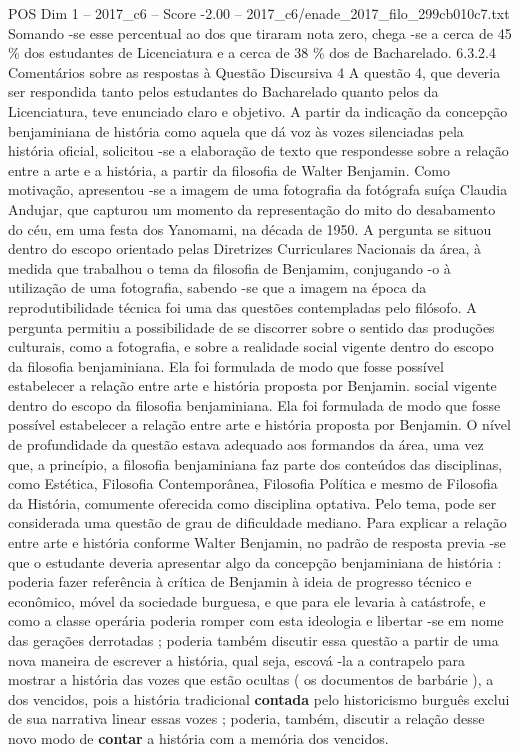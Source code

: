 \begin{textsample}{POS Dim 1 – 2017\_c6 – Score -2.00 – 2017\_c6/enade\_2017\_filo\_299cb010c7.txt}
Somando -se esse percentual ao dos que tiraram nota zero, chega -se a cerca de 45 \% dos estudantes de Licenciatura e a cerca de 38 \% dos de Bacharelado. 6.3.2.4 Comentários sobre as respostas à Questão Discursiva 4 A questão 4, que deveria ser respondida tanto pelos estudantes do Bacharelado quanto pelos da Licenciatura, teve enunciado claro e objetivo.
A partir da indicação da concepção benjaminiana de história como aquela que dá voz às vozes silenciadas pela história oficial, solicitou -se a elaboração de texto que respondesse sobre a relação entre a arte e a história, a partir da filosofia de Walter Benjamin.
Como motivação, apresentou -se a imagem de uma fotografia da fotógrafa suíça Claudia Andujar, que capturou um momento da representação do mito do desabamento do céu, em uma festa dos Yanomami, na década de 1950.
A pergunta se situou dentro do escopo orientado pelas Diretrizes Curriculares Nacionais da área, à medida que trabalhou o tema da filosofia de Benjamim, conjugando -o à utilização de uma fotografia, sabendo -se que a imagem na época da reprodutibilidade técnica foi uma das questões contempladas pelo filósofo.
A pergunta permitiu a possibilidade de se discorrer sobre o sentido das produções culturais, como a fotografia, e sobre a realidade social vigente dentro do escopo da filosofia benjaminiana.
Ela foi formulada de modo que fosse possível estabelecer a relação entre arte e história proposta por Benjamin. social vigente dentro do escopo da filosofia benjaminiana.
Ela foi formulada de modo que fosse possível estabelecer a relação entre arte e história proposta por Benjamin.
O nível de profundidade da questão estava adequado aos formandos da área, uma vez que, a princípio, a filosofia benjaminiana faz parte dos conteúdos das disciplinas, como Estética, Filosofia Contemporânea, Filosofia Política e mesmo de Filosofia da História, comumente oferecida como disciplina optativa.
Pelo tema, pode ser considerada uma questão de grau de dificuldade mediano.
Para explicar a relação entre arte e história conforme Walter Benjamin, no padrão de resposta previa -se que o estudante deveria apresentar algo da concepção benjaminiana de história : poderia fazer referência à crítica de Benjamin à ideia de progresso técnico e econômico, móvel da sociedade burguesa, e que para ele levaria à catástrofe, e como a classe operária poderia romper com esta ideologia e libertar -se em nome das gerações derrotadas ; poderia também discutir essa questão a partir de uma nova maneira de escrever a história, qual seja, escová -la a contrapelo para mostrar a história das vozes que estão ocultas ( os documentos de barbárie ), a dos vencidos, pois a história tradicional \textbf{contada} pelo historicismo burguês exclui de sua narrativa linear essas vozes ; poderia, também, discutir a relação desse novo modo de \textbf{contar} a história com a memória dos vencidos.

\end{textsample}
